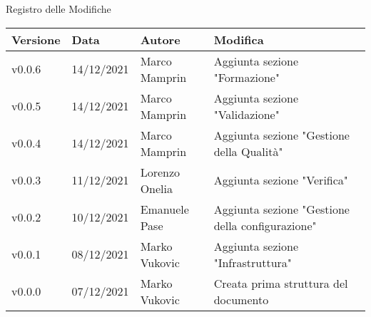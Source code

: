 \begin{center}
  \huge{Registro delle Modifiche}
\end{center}

\begin{center}
  \begin{tabular}{|p{2cm}|p{2cm}|p{3cm}|p{5cm}|}
    \hline
    \textbf{Versione} & \textbf{Data} & \textbf{Autore} & \textbf{Modifica}                    \\ \hline
    v0.0.6            & 14/12/2021    & Marco Mamprin   & Aggiunta sezione "Formazione" \\ \hline
    v0.0.5            & 14/12/2021    & Marco Mamprin   & Aggiunta sezione "Validazione" \\ \hline
    v0.0.4            & 14/12/2021    & Marco Mamprin   & Aggiunta sezione "Gestione della Qualità" \\ \hline
    v0.0.3            & 11/12/2021    & Lorenzo Onelia  & Aggiunta sezione "Verifica" \\ \hline
    v0.0.2            & 10/12/2021    & Emanuele Pase   & Aggiunta sezione "Gestione della configurazione" \\ \hline
    v0.0.1            & 08/12/2021    & Marko Vukovic   & Aggiunta sezione "Infrastruttura" \\ \hline
    v0.0.0            & 07/12/2021    & Marko Vukovic   & Creata prima struttura del documento \\ \hline
  \end{tabular}
\end{center}
